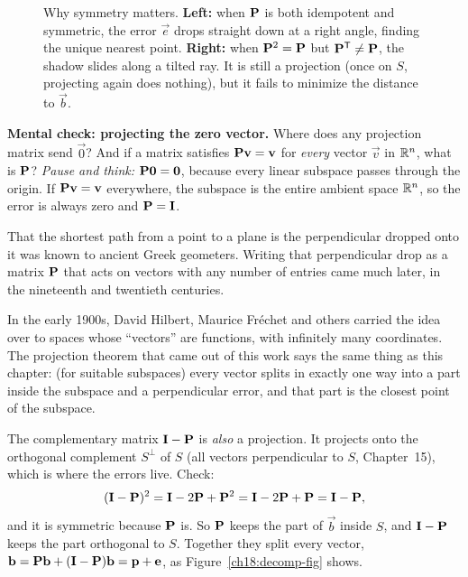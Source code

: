 \begin{figure}[H]
\caption{Why symmetry matters. \textbf{Left:} when $\mathbf{P}$ is both idempotent and symmetric, the error $\vec{e}$ drops straight down at a right angle, finding the unique nearest point. \textbf{Right:} when $\mathbf{P}^2 = \mathbf{P}$ but $\mathbf{P}^{\mathsf{T}} \ne \mathbf{P}$, the shadow slides along a tilted ray. It is still a projection (once on $S$, projecting again does nothing), but it fails to minimize the distance to $\vec{b}$.}
\label{ch18:orthog-vs-oblique}
\end{figure}

\begin{recoverybox}
\textbf{Mental check: projecting the zero vector.} Where does any projection matrix send $\vec{0}$?
And if a matrix satisfies $\mathbf{P}\mathbf{v} = \mathbf{v}$ for \emph{every} vector $\vec{v}$ in $\mathbb{R}^n$, what is $\mathbf{P}$?
\emph{Pause and think:} $\mathbf{P}\mathbf{0} = \mathbf{0}$, because every linear subspace passes through the
origin. If $\mathbf{P}\mathbf{v}=\mathbf{v}$ everywhere, the subspace is the entire ambient space $\mathbb{R}^n$, so the error is
always zero and $\mathbf{P} = \mathbf{I}$.
\end{recoverybox}

\begin{historybox}
That the shortest path from a point to a plane is the perpendicular dropped onto it was known to
ancient Greek geometers. Writing that perpendicular drop as a matrix $\mathbf{P}$ that acts on vectors
with any number of entries came much later, in the nineteenth and twentieth centuries.

In the early 1900s, David Hilbert, Maurice Fréchet and others carried the idea over to spaces whose
``vectors'' are functions, with infinitely many coordinates. The projection theorem that came out of
this work says the same thing as this chapter: (for suitable subspaces) every vector splits in
exactly one way into a part inside the subspace and a perpendicular error, and that part is the
closest point of the subspace.
\end{historybox}

\begin{remark}
The complementary matrix $\mathbf{I}-\mathbf{P}$ is \emph{also} a projection. It projects onto the
orthogonal complement $S^\perp$ of $S$ (all vectors perpendicular to $S$, Chapter~15), which is
where the errors live. Check:
\[
  (\mathbf{I}-\mathbf{P})^2 = \mathbf{I}-2\mathbf{P}+\mathbf{P}^2 = \mathbf{I}-2\mathbf{P}+\mathbf{P} = \mathbf{I}-\mathbf{P},
\]
and it is symmetric because $\mathbf{P}$ is. So $\mathbf{P}$ keeps the part of $\vec{b}$ inside $S$, and
$\mathbf{I}-\mathbf{P}$ keeps the part orthogonal to $S$. Together they split every vector,
$\mathbf{b} = \mathbf{P}\mathbf{b} + (\mathbf{I}-\mathbf{P})\mathbf{b} = \mathbf{p} + \mathbf{e}$, as
Figure~\ref{ch18:decomp-fig} shows.
\end{remark}


